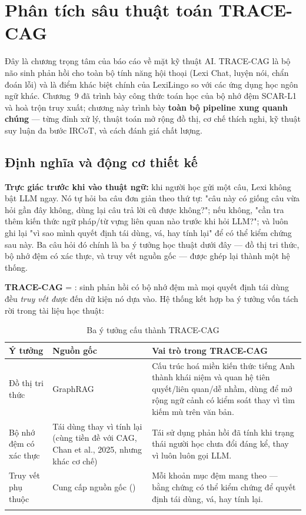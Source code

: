 \chapter{Phân tích sâu thuật toán TRACE-CAG}

Đây là chương trọng tâm của báo cáo về mặt kỹ thuật AI. TRACE-CAG là bộ não sinh phản hồi
cho toàn bộ tính năng hội thoại (Lexi Chat, luyện nói, chẩn đoán lỗi) và là điểm khác biệt
chính của LexiLingo so với các ứng dụng học ngôn ngữ khác. Chương~9 đã trình bày công thức
toán học của bộ nhớ đệm SCAR-L1 và hoà trộn truy xuất; chương này trình bày \textbf{toàn bộ
pipeline xung quanh chúng} — từng đỉnh xử lý, thuật toán mở rộng đồ thị, cơ chế thích nghi,
kỹ thuật suy luận đa bước IRCoT, và cách đánh giá chất lượng.

\section{Định nghĩa và động cơ thiết kế}

\textbf{Trực giác trước khi vào thuật ngữ:} khi người học gửi một câu, Lexi không bật LLM
ngay. Nó tự hỏi ba câu đơn giản theo thứ tự: "câu này có giống câu vừa hỏi gần đây không,
dùng lại câu trả lời cũ được không?"; nếu không, "cần tra thêm kiến thức ngữ pháp/từ vựng
liên quan nào trước khi hỏi LLM?"; và luôn ghi lại "vì sao mình quyết định tái dùng, vá, hay
tính lại" để có thể kiểm chứng sau này. Ba câu hỏi đó chính là ba ý tưởng học thuật dưới đây
— đồ thị tri thức, bộ nhớ đệm có xác thực, và truy vết nguồn gốc — được ghép lại thành một
hệ thống.

\textbf{TRACE-CAG} = : sinh phản hồi có bộ nhớ đệm
mà mọi quyết định tái dùng đều \emph{truy vết được} đến dữ kiện nó dựa vào. Hệ thống kết hợp
ba ý tưởng vốn tách rời trong tài liệu học thuật:

\begin{longtable}{L{2.6cm} L{4.2cm} L{6.4cm}}
\toprule
\textbf{Ý tưởng} & \textbf{Nguồn gốc} & \textbf{Vai trò trong TRACE-CAG}\\
\midrule
\endhead
Đồ thị tri thức & GraphRAG & Cấu trúc hoá miền kiến thức tiếng Anh thành khái niệm và quan hệ tiên quyết/liên quan/dễ nhầm, dùng để mở rộng ngữ cảnh có kiểm soát thay vì tìm kiếm mù trên văn bản.\\
Bộ nhớ đệm có xác thực & Tái dùng thay vì tính lại (cùng tiền đề với CAG, Chan et al., 2025, nhưng khác cơ chế) & Tái sử dụng phản hồi đã tính khi trạng thái người học chưa đổi đáng kể, thay vì luôn luôn gọi LLM.\\
Truy vết phụ thuộc & Cung cấp nguồn gốc () & Mỗi khoản mục đệm mang theo  — bằng chứng có thể kiểm chứng để quyết định tái dùng, vá, hay tính lại.\\
\bottomrule
\caption{Ba ý tưởng cấu thành TRACE-CAG}
\end{longtable}

